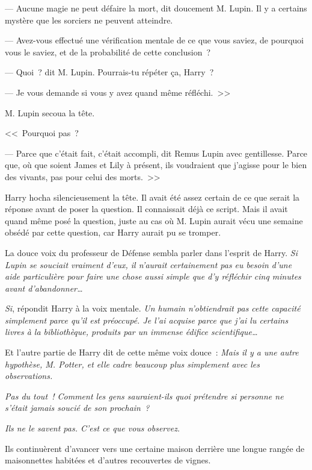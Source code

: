 --- Aucune magie ne peut défaire la mort, dit doucement M. Lupin. Il y a certains mystère que les sorciers ne peuvent atteindre.

--- Avez-vous effectué une vérification mentale de ce que vous saviez, de pourquoi vous le saviez, et de la probabilité de cette conclusion~?

--- Quoi~? dit M. Lupin. Pourrais-tu répéter ça, Harry~?

--- Je vous demande si vous y avez quand même réfléchi.~>>

M. Lupin secoua la tête.

<<~Pourquoi pas~?

--- Parce que c'était fait, c'était accompli, dit Remus Lupin avec gentillesse. Parce que, où que soient James et Lily à présent, ils voudraient que j'agisse pour le bien des vivants, pas pour celui des morts.~>>

Harry hocha silencieusement la tête. Il avait été assez certain de ce que serait la réponse avant de poser la question. Il connaissait déjà ce script. Mais il avait quand même posé la question, juste au cas où M. Lupin aurait vécu une semaine obsédé par cette question, car Harry aurait pu se tromper.

La douce voix du professeur de Défense sembla parler dans l'esprit de Harry. \emph{Si Lupin se souciait vraiment d'eux, il n'aurait certainement pas eu besoin d'une aide particulière pour faire une chose aussi simple que d'y réfléchir cinq minutes avant d'abandonner…}

\emph{Si}, répondit Harry à la voix mentale. \emph{Un humain n'obtiendrait pas cette capacité simplement parce qu'il est préoccupé. Je l'ai acquise parce que j'ai lu certains livres à la bibliothèque, produits par un immense édifice scientifique…}

Et l'autre partie de Harry dit de cette même voix douce~: \emph{Mais il y a une autre hypothèse, M. Potter, et elle cadre beaucoup plus simplement avec les observations.}

\emph{Pas du tout~! Comment les gens sauraient-ils quoi prétendre si personne ne s'était jamais soucié de son prochain~?}

\emph{Ils ne le savent pas. C'est ce que vous observez.}

Ils continuèrent d'avancer vers une certaine maison derrière une longue rangée de maisonnettes habitées et d'autres recouvertes de vignes.

